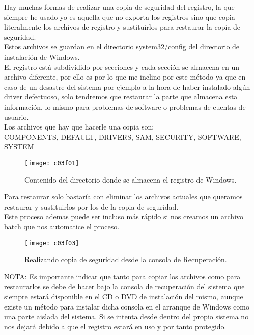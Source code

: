 Hay muchas formas de realizar una copia de seguridad del registro, la que siempre he usado yo es aquella que no exporta los registros sino que copia literalmente los archivos de registro y sustituirlos para restaurar la copia de seguridad.\\

Estos archivos se guardan en el directorio system32/config del directorio de instalación de Windows.\\

El registro está subdividido por secciones y cada sección se almacena en un archivo diferente, por ello es por lo que me inclino por este método ya que en caso de un desastre del sistema por ejemplo a la hora de haber instalado algún driver defectuoso, solo tendremos que restaurar la parte que almacena esta información, lo mismo para problemas de software o problemas de cuentas de usuario.\\

Los archivos que hay que hacerle una copia son:\\
COMPONENTS, DEFAULT, DRIVERS, SAM, SECURITY, SOFTWARE, SYSTEM\\

\begin{figure}[H]
	\centering
	\texttt{[image: c03f01]}
	\caption{Contenido del directorio donde se almacena el registro de Windows.}
	\label{fig:c03f01}
\end{figure}
\clearpage
Para restaurar solo bastaría con eliminar los archivos actuales que queramos restaurar y sustituirlos por los de la copia de seguridad.\\

Este proceso ademas puede ser incluso más rápido si nos creamos un archivo batch que nos automatice el proceso.\\

\begin{figure}[H]
	\centering
	\texttt{[image: c03f03]}
	\caption{Realizando copia de seguridad desde la consola de Recuperación.}
	\label{fig:c03f03}
\end{figure}
\clearpage
NOTA: Es importante indicar que tanto para copiar los archivos como para restaurarlos se debe de hacer bajo la consola de recuperación del sistema que siempre estará disponible en el CD o DVD de instalación del mismo, aunque existe un método para instalar dicha consola en el arranque de Windows como una parte aislada del sistema. Si se intenta desde dentro del propio sistema no nos dejará debido a que el registro estará en uso y por tanto protegido.

